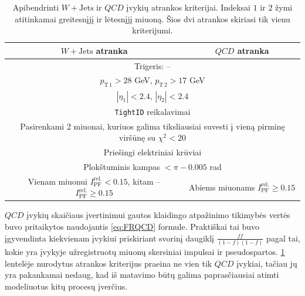 \documentclass[a4paper, 12pt, oneside]{article}
\newcommand{\ttt}[1]{\texttt{#1}}
\newcommand{\WJets}{W\! +\!\mathrm{Jets}}
\newcommand{\QCD}{QC\! D}
\newlength\q
\begin{document}
\begin{table}
	\begin{tabular}{|c|c|}
		\hline
		\textbf{$\WJets$ atranka} & \textbf{$\QCD$ atranka} \\
		\hline\hline
		\multicolumn{2}{|c|}{Trigeris: --} \\
		\hline
		\multicolumn{2}{|c|}{$p_{\mathrm{T \, 1}} > 28$ GeV, $p_{\mathrm{T \, 2}} > 17$ GeV} \\
		\hline
		\multicolumn{2}{|c|}{$|\eta_1| < 2.4$, $|\eta_2| < 2.4$} \\
		\hline
		\multicolumn{2}{|c|}{\ttt{TightID} reikalavimai} \\
		\hline
		\multicolumn{2}{|c|}{\multirow{3}{17em}{\centering Pasirenkami 2 miuonai, kuriuos galima tiksliausiai suvesti į vieną
		pirminę viršūnę su $\chi^2<20$}} \\
		\multicolumn{2}{|c|}{} \\
		\multicolumn{2}{|c|}{} \\
		\hline
		\multicolumn{2}{|c|}{Priešingi elektriniai krūviai} \\
		\hline
		\multicolumn{2}{|c|}{Plokštuminis kampas $< \pi - 0.005$ rad} \\
		\hline
		\multirow{2}{15em}{\centering Vienam miuonui $I_{\mathrm{PF}}^{\mathrm{rel.}}<0.15$,
			kitam -- $I_{\mathrm{PF}}^{\mathrm{rel.}}\geqslant 0.15$} &
			\multirow{2}{15em}{\centering Abiems miuonams $I_{\mathrm{PF}}^{\mathrm{rel.}}\geqslant 0.15$} \\
		 & \\
		\hline
	\end{tabular}
	\caption{\label{table:jetSelection}Apibendrinti $\WJets$ ir $\QCD$ įvykių atrankos kriterijai. Indeksai $1$ ir $2$ žymi
	atitinkamai greitesnįjį ir lėtesnįjį miuoną. Šios dvi atrankos skiriasi tik vienu kriterijumi.}
\end{table}

$\QCD$ įvykių skaičiaus įvertinimui gautos klaidingo atpažinimo tikimybės vertės buvo pritaikytos naudojantis \ref{eq:FRQCD}
formule.
Praktiškai tai buvo įgyvendinta kiekvienam įvykiui priskiriant svorinį daugiklį $\frac{ff}{(1-f)(1-f)}$ pagal tai, kokie
yra įvykyje užregistruotų miuonų skersiniai impulsai ir pseudospartos.
\ref{table:jetSelection} lentelėje nurodytus atrankos kriterijus praeina ne vien tik $\QCD$ įvykiai, tačiau jų yra pakankamai
nedaug, kad iš matavimo būtų galima paprasčiausiai atimti modeliuotus kitų procesų įverčius.
\end{document}
